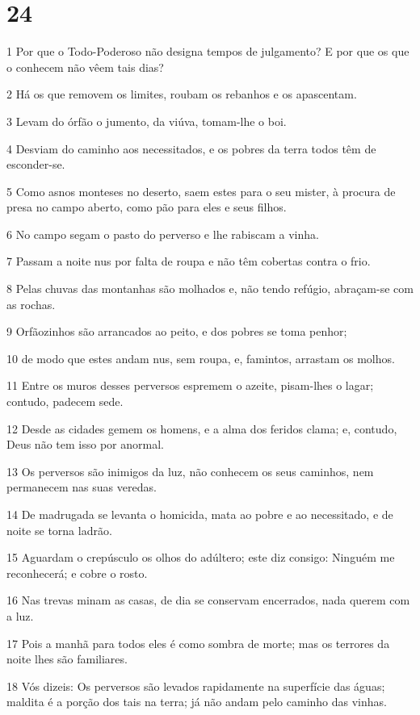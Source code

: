 \chapter{24}

\par 1 Por que o Todo-Poderoso não designa tempos de julgamento? E por que os que o conhecem não vêem tais dias?
\par 2 Há os que removem os limites, roubam os rebanhos e os apascentam.
\par 3 Levam do órfão o jumento, da viúva, tomam-lhe o boi.
\par 4 Desviam do caminho aos necessitados, e os pobres da terra todos têm de esconder-se.
\par 5 Como asnos monteses no deserto, saem estes para o seu mister, à procura de presa no campo aberto, como pão para eles e seus filhos.
\par 6 No campo segam o pasto do perverso e lhe rabiscam a vinha.
\par 7 Passam a noite nus por falta de roupa e não têm cobertas contra o frio.
\par 8 Pelas chuvas das montanhas são molhados e, não tendo refúgio, abraçam-se com as rochas.
\par 9 Orfãozinhos são arrancados ao peito, e dos pobres se toma penhor;
\par 10 de modo que estes andam nus, sem roupa, e, famintos, arrastam os molhos.
\par 11 Entre os muros desses perversos espremem o azeite, pisam-lhes o lagar; contudo, padecem sede.
\par 12 Desde as cidades gemem os homens, e a alma dos feridos clama; e, contudo, Deus não tem isso por anormal.
\par 13 Os perversos são inimigos da luz, não conhecem os seus caminhos, nem permanecem nas suas veredas.
\par 14 De madrugada se levanta o homicida, mata ao pobre e ao necessitado, e de noite se torna ladrão.
\par 15 Aguardam o crepúsculo os olhos do adúltero; este diz consigo: Ninguém me reconhecerá; e cobre o rosto.
\par 16 Nas trevas minam as casas, de dia se conservam encerrados, nada querem com a luz.
\par 17 Pois a manhã para todos eles é como sombra de morte; mas os terrores da noite lhes são familiares.
\par 18 Vós dizeis: Os perversos são levados rapidamente na superfície das águas; maldita é a porção dos tais na terra; já não andam pelo caminho das vinhas.
